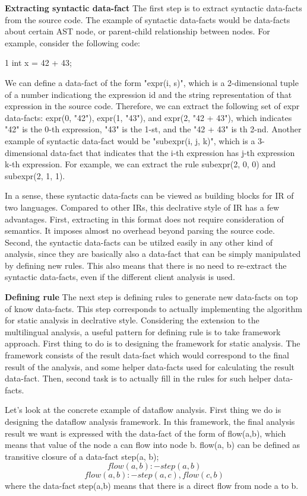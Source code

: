\textbf{Extracting syntactic data-fact}
The first step is to extract syntactic data-facts from the source code.
The example of syntactic data-facts would be data-facts about certain
AST node, or parent-child relationship between nodes. For example, consider
the following code:

1 int x = 42 + 43;

We can define a data-fact of the form "expr(i, s)", which is a 2-dimensional
tuple of a number indicationg the expression id and the string representation
of that expression in the source code.  Therefore, we can extract the following
set of expr data-facts: expr(0, "42"), expr(1, "43"), and expr(2, "42 + 43"),
which indicates "42" is the 0-th expression, "43" is the 1-st, and the "42 +
43" is th 2-nd.  Another example of syntactic data-fact would be "subexpr(i, j,
k)", which is a 3-dimensional data-fact that indicates that the i-th expression
has j-th expression k-th expression. For example, we can extract the rule
subexpr(2, 0, 0) and subexpr(2, 1, 1).

In a sense, these syntactic data-facts can be viewed as building blocks for IR
of two languages.  Compared to other IRs, this declrative style of IR has a few
advantages. First, extracting in this format does not require consideration of
semantics.  It imposes almost no overhead beyond parsing the source code.
Second, the syntactic data-facts can be utilzed easily in any other kind of
analysis, since they are basically also a data-fact that can be simply
manipulated by defining new rules.  This also means that there is no need to
re-extract the syntactic data-facts, even if the different client analysis is
used.

\textbf{Defining rule}
The next step is defining rules to generate new data-facts on top of know
data-facts. This step corresponds to actually implementing the algorithm for
static analysis in declrative style. Considering the extension to the
multilingual analysis, a useful pattern for defining rule is to take framework
approach.  First thing to do is to designing the framework for static analysis.
The framework consists of the result data-fact which would correspond to the
final result of the analysis, and some helper data-facts used for calculating
the result data-fact. Then, second task is to actually fill in the rules for
such helper data-facts.

Let's look at the concrete example of dataflow analysis. First thing we do is
designing the dataflow analysis framework.  In this framework, the final
analysis result we want is expressed with the data-fact of the form of
flow(a,b), which means that value of the node a can flow into node b. flow(a,
b) can be defined as transitive closure of a data-fact step(a, b);
\[flow(a,b) :- step(a,b)\]
\[flow(a,b) :- step(a,c), flow(c, b)\]
where the data-fact step(a,b) means that there is a direct flow from node a to b.

